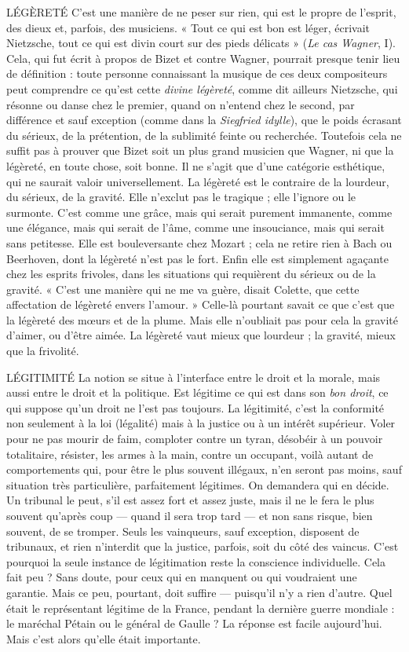 {LÉGÈRETÉ C’est une manière de ne peser sur rien, qui est le propre de
l'esprit, des dieux et, parfois, des musiciens.
« Tout ce qui est bon est léger, écrivait Nietzsche, tout ce qui est divin
court sur des pieds délicats » ({\it Le cas Wagner}, I). Cela, qui fut écrit à propos de
Bizet et contre Wagner, pourrait presque tenir lieu de définition : toute personne
connaissant la musique de ces deux compositeurs peut comprendre ce
qu'est cette {\it divine légèreté}, comme dit ailleurs Nietzsche, qui résonne ou danse
chez le premier, quand on n’entend chez le second, par différence et sauf exception
(comme dans la {\it Siegfried idylle}), que le poids écrasant du sérieux, de la prétention,
de la sublimité feinte ou recherchée. Toutefois cela ne suffit pas à
prouver que Bizet soit un plus grand musicien que Wagner, ni que la légèreté,
en toute chose, soit bonne. Il ne s’agit que d’une catégorie esthétique, qui ne
saurait valoir universellement. La légèreté est le contraire de la lourdeur, du
sérieux, de la gravité. Elle n’exclut pas le tragique ; elle l’ignore ou le surmonte.
C’est comme une grâce, mais qui serait purement immanente, comme une élégance,
mais qui serait de l’âme, comme une insouciance, mais qui serait sans
petitesse. Elle est bouleversante chez Mozart ; cela ne retire rien à Bach ou
Beerhoven, dont la légèreté n’est pas le fort. Enfin elle est simplement agaçante
chez les esprits frivoles, dans les situations qui requièrent du sérieux ou de la
gravité. « C’est une manière qui ne me va guère, disait Colette, que cette affectation
de légèreté envers l’amour. » Celle-là pourtant savait ce que c’est que la
légèreté des mœurs et de la plume. Mais elle n’oubliait pas pour cela la gravité
d'aimer, ou d’être aimée. La légèreté vaut mieux que lourdeur ; la gravité,
mieux que la frivolité.

LÉGITIMITÉ La notion se situe à l'interface entre le droit et la morale,
mais aussi entre le droit et la politique. Est légitime ce qui est
dans son {\it bon droit}, ce qui suppose qu’un droit ne l’est pas toujours. La légitimité,
c’est la conformité non seulement à la loi (légalité) mais à la justice ou à
un intérêt supérieur. Voler pour ne pas mourir de faim, comploter contre un
tyran, désobéir à un pouvoir totalitaire, résister, les armes à la main, contre un
occupant, voilà autant de comportements qui, pour être le plus souvent illégaux,
n'en seront pas moins, sauf situation très particulière, parfaitement légitimes.
On demandera qui en décide. Un tribunal le peut, s’il est assez fort et
assez juste, mais il ne le fera le plus souvent qu’après coup — quand il sera trop
tard — et non sans risque, bien souvent, de se tromper. Seuls les vainqueurs,
sauf exception, disposent de tribunaux, et rien n’interdit que la justice, parfois,
soit du côté des vaincus. C’est pourquoi la seule instance de légitimation reste
la conscience individuelle. Cela fait peu ? Sans doute, pour ceux qui en manquent
ou qui voudraient une garantie. Mais ce peu, pourtant, doit suffire —
puisqu'il n’y a rien d’autre. Quel était le représentant légitime de la France,
pendant la dernière guerre mondiale : le maréchal Pétain ou le général de
Gaulle ? La réponse est facile aujourd’hui. Mais c’est alors qu’elle était importante.

}
